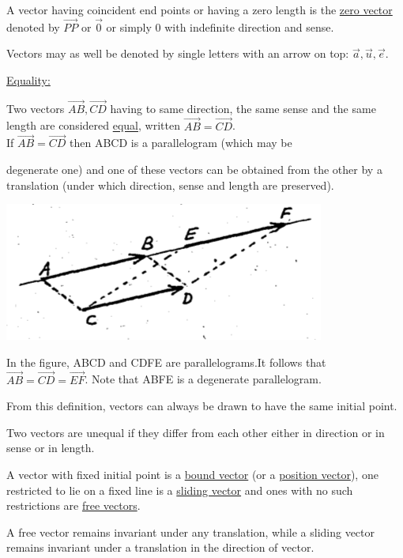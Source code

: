 \documentclass[11pt]{amsbook}
\begin{document}
    
    A vector having coincident end points or having a zero length is the \underline{zero vector} denoted by $\vec{PP}$ or $\vec{0}$ or simply 0 with indefinite direction and sense.
    
    Vectors may as well be denoted by single letters with an arrow on top: $\vec{a},\vec{u},\vec{e}$.
    
    \underline{Equality:}
    
    Two vectors $\vec{AB},\vec{CD}$ having to same direction, the same sense and the same length are considered \underline{equal}, written $\vec{AB}=\vec{CD}$. \\
    
    \qquad If $\vec{AB} = \vec{CD}$ then ABCD is a parallelogram (which may be
    
    \begin{minipage}{0.6\textwidth}
    degenerate one) and one of these vectors can be obtained from the other by a translation (under which direction, sense and length are preserved).
	\end{minipage}
	\hfill
	\begin{minipage}{0.4\textwidth}
	\includegraphics[width=\textwidth]{images/b2p1-118-fig01.png}
	\end{minipage}
    
    In the figure, ABCD and CDFE are parallelograms.It follows that $\vec{AB}=\vec{CD}=\vec{EF}$. Note that ABFE is a degenerate parallelogram. 
    
    From this definition, vectors can always be drawn to have the same initial point.
    
    Two vectors are unequal if they differ from each other either in direction or in sense or in length.
    
    A vector with fixed initial point is a \underline{bound vector} (or a \underline{position vector}), one restricted to lie on a fixed line is a \underline{sliding vector} and ones with no such restrictions are \underline{free vectors}.
    
    A free vector remains invariant under any translation, while a sliding vector remains invariant under a translation in the direction of vector.
\end{document}
